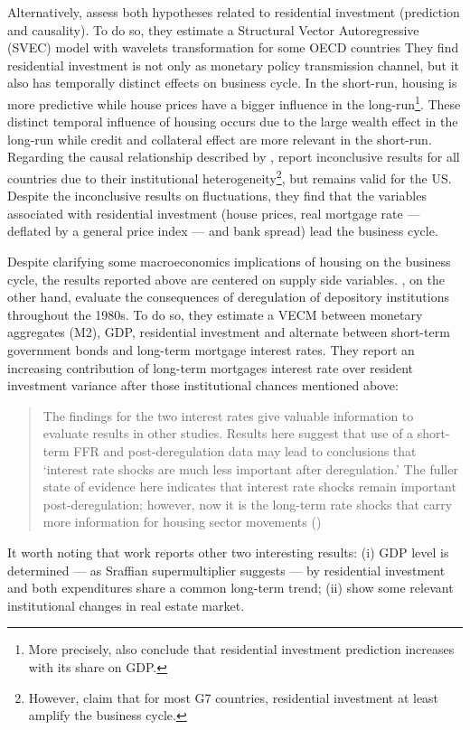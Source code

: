 Alternatively, \textcite{huang_is_2018} assess both \textcite{leamer_housing_2007} hypotheses related to residential investment (prediction and causality). 
To do so, they estimate a Structural Vector Autoregressive (SVEC) model with wavelets transformation for some OECD countries
They find residential investment is not only as monetary policy transmission channel, but it also has temporally distinct effects on business cycle.
In the short-run, housing is more predictive while house prices have a bigger influence in the long-run\footnote{
	More precisely, \textcite{huang_is_2018} also conclude that residential investment prediction increases with its share on GDP.
}. 
These distinct temporal influence of housing occurs due to the large wealth effect in the long-run while credit and collateral effect are more relevant in the short-run.
Regarding the causal relationship described by \textcite{leamer_housing_2007}, 
\textcite{huang_is_2018} report inconclusive results for all countries due to their institutional heterogeneity\footnote{
	However, \textcite{huang_is_2018} claim that for most G7 countries, residential investment at least amplify the business cycle.
}, but remains valid for the US.
Despite the inconclusive results on fluctuations, they find that the variables associated with residential investment (house prices, real mortgage rate --- deflated by a general price index --- and bank spread) lead the business cycle.

Despite clarifying some macroeconomics  implications of housing on the business cycle, the results reported above are centered on supply side variables.
\textcite{gauger_residential_2003}, on the other hand, evaluate the consequences of deregulation of depository institutions throughout the 1980s.
To do so, they estimate a VECM between monetary aggregates (M2), GDP, residential investment and alternate between short-term government bonds and long-term mortgage interest rates. 
They report an increasing contribution of long-term mortgages interest rate over resident investment variance after those institutional chances mentioned above:

\begin{quotation}
	The findings for the two interest rates give valuable information to evaluate results in other studies. Results here suggest that use of a short-term FFR and post-deregulation data may lead to conclusions that `interest rate shocks are much less important after deregulation.' The fuller state of evidence here indicates that interest rate shocks remain important post-deregulation; however, now it is the long-term rate shocks that carry more information for housing sector movements (\cite[p.~346]{gauger_residential_2003})
\end{quotation}
It worth noting that \textcite{gauger_residential_2003} work reports other two interesting results:
	(i) GDP level is determined --- as Sraffian supermultiplier  suggests --- by residential investment and both expenditures share a common long-term trend;
	(ii) show some relevant institutional changes in real estate market.

